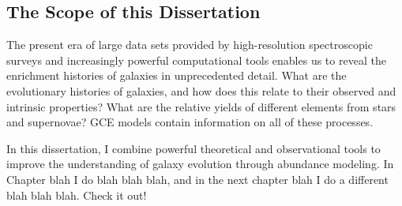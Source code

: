 \documentclass[main.tex]{subfiles}
\begin{document}
\begin{doublespace}
\section{The Scope of this Dissertation}
\label{main:sec:intro:scope}

The present era of large data sets provided by high-resolution spectroscopic
surveys and increasingly powerful computational tools enables us to reveal the
enrichment histories of galaxies in unprecedented detail.
What are the evolutionary histories of galaxies, and how does this relate to
their observed and intrinsic properties?
What are the relative yields of different elements from stars and supernovae?
GCE models contain information on all of these processes.
\par
In this dissertation, I combine powerful theoretical and observational tools
to improve the understanding of galaxy evolution through abundance modeling.
In Chapter blah I do blah blah blah, and in the next chapter blah I do a
different blah blah blah.
Check it out!

\end{doublespace}
\end{document}
